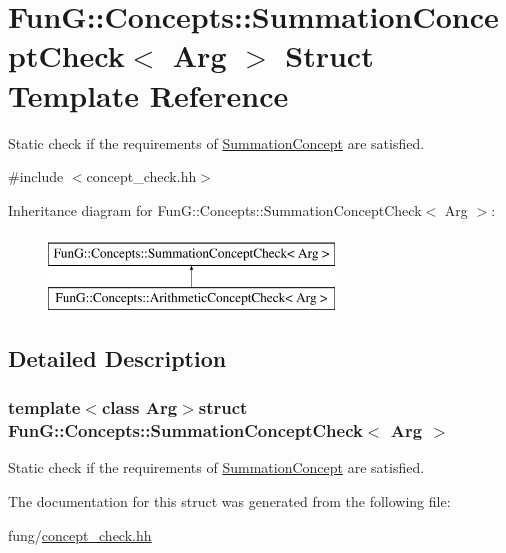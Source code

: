 \hypertarget{structFunG_1_1Concepts_1_1SummationConceptCheck}{\section{Fun\-G\-:\-:Concepts\-:\-:Summation\-Concept\-Check$<$ Arg $>$ Struct Template Reference}
\label{structFunG_1_1Concepts_1_1SummationConceptCheck}
}


Static check if the requirements of \hyperlink{structFunG_1_1Concepts_1_1SummationConcept}{Summation\-Concept} are satisfied.  




{\ttfamily \#include $<$concept\-\_\-check.\-hh$>$}

Inheritance diagram for Fun\-G\-:\-:Concepts\-:\-:Summation\-Concept\-Check$<$ Arg $>$\-:\begin{figure}[H]
\begin{center}
\leavevmode
\includegraphics[height=2.000000cm]{structFunG_1_1Concepts_1_1SummationConceptCheck}
\end{center}
\end{figure}


\subsection{Detailed Description}
\subsubsection*{template$<$class Arg$>$struct Fun\-G\-::\-Concepts\-::\-Summation\-Concept\-Check$<$ Arg $>$}

Static check if the requirements of \hyperlink{structFunG_1_1Concepts_1_1SummationConcept}{Summation\-Concept} are satisfied. 

The documentation for this struct was generated from the following file\-:\begin{DoxyCompactItemize}
\item 
fung/\hyperlink{concept__check_8hh}{concept\-\_\-check.\-hh}\end{DoxyCompactItemize}
